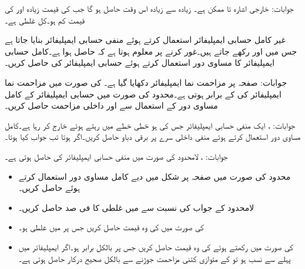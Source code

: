 جوابات: خارجی اشارہ  تا  ممکن ہے۔   زیادہ سے زیادہ  اس وقت حاصل ہو گا جب   کی قیمت  زیادہ اور  کی قیمت   کم ہو۔کل غلطی  ہے۔

غیر کامل حسابی ایمپلیفائر استعمال کرتے ہوئے  منفی حسابی ایمپلیفائر بنایا جاتا ہے جس میں  اور  رکھے جاتے ہیں۔غور کرنے پر معلوم ہوتا ہے کہ  حاصل ہوا ہے۔کامل حسابی ایمپلیفائر کا مساوی دور استعمال کرتے ہوئے  حسابی ایمپلیفائر کی  حاصل کریں۔

جوابات: 
صفحہ  پر مزاحمت نما ایمپلیفائر دکھایا گیا ہے۔ کی صورت میں مزاحمت نما ایمپلیفائر کی
  کے برابر ہوتی ہے۔محدود  کی صورت میں  حسابی ایمپلیفائر کے کامل مساوی دور کے استعمال سے  اور داخلی مزاحمت حاصل کریں۔

جوابات: ، 
ایک منفی حسابی ایمپلیفائر جس کی  ہو خطی خطے میں رہتے ہوئے  خارج کر رہا ہے۔کامل مساوی دور استعمال کرتے ہوئے منفی داخلی سرے  پر برقی دباو حاصل کریں۔اگر  ہوتا تب جواب کیا ہوتا۔
	
جوابات: ،   
لامحدود  کی صورت میں منفی حسابی ایمپلیفائر کی  حاصل ہوتی ہے۔
\begin{itemize}
\item
محدود   کی صورت میں صفحہ  پر شکل  میں دیے  کامل مساوی دور استعمال کرتے ہوئے  حاصل کریں۔ 
\item
لامحدود  کے جواب کی نسبت سے  میں غلطی کا فی صد حاصل کریں۔
\item
{} کی صورت میں  کی وہ قیمت حاصل کریں جس پر  میں غلطی ہو۔
\item
{} کی صورت میں  رکھتے ہوئے  کی وہ قیمت حاصل کریں جس پر  بالکل برابر  ہو۔اگر ایمپلیفائر میں  پہلے سے نسب ہو تو  کے متوازی کتنی مزاحمت جوڑنے سے  بالکل صحیح درکار  حاصل ہوتی ہے۔

\end{itemize}

